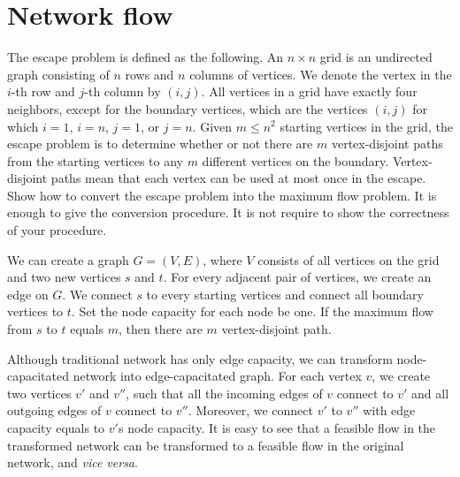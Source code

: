 \section{Network flow}
\begin{Exercise}[origin={NTU CSIE 100}]
The escape problem is defined as the following. An $n \times n$ grid is an undirected graph consisting of $n$ rows and $n$ columns of vertices. We denote the vertex in the $i$-th row and $j$-th column by $(i, j)$. All vertices in a grid have exactly four neighbors, except for the boundary vertices, which are the vertices $(i, j)$ for which $i = 1$, $i = n$, $j = 1$, or $j = n$. Given $m \leq n^2$ starting vertices in the grid, the escape problem is to determine whether or not there are $m$ vertex-disjoint paths from the starting vertices to any $m$ different vertices on the boundary. Vertex-disjoint paths mean that each vertex can be used at most once in the escape. Show how to convert the escape problem into the maximum flow problem. It is enough to give the conversion procedure. It is not require to show the correctness of your procedure.
\end{Exercise}
\begin{Answer}
We can create a graph $G = (V, E)$, where $V$ consists of all vertices on the grid and two new vertices $s$ and $t$. For every adjacent pair of vertices, we create an edge on $G$. We connect $s$ to every starting vertices and connect all boundary vertices to $t$. Set the node capacity for each node be one. If the maximum flow from $s$ to $t$ equals $m$, then there are $m$ vertex-disjoint path.

Although traditional network has only edge capacity, we can transform node-capacitated network into edge-capacitated graph. For each vertex $v$, we create two vertices $v'$ and $v''$, such that all the incoming edges of $v$ connect to $v'$ and all outgoing edges of $v$ connect to $v''$. Moreover, we connect $v'$ to $v''$ with edge capacity equals to $v'$s node capacity. It is easy to see that a feasible flow in the transformed network can be transformed to a feasible flow in the original network, and \textit{vice versa}.
\end{Answer}
%

